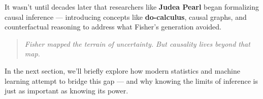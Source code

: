 \medskip

It wasn’t until decades later that researchers like \textbf{Judea Pearl} began formalizing causal inference — introducing concepts like \textbf{do-calculus}, causal graphs, and counterfactual reasoning to address what Fisher’s generation avoided.

\medskip

\begin{quote}
\textit{Fisher mapped the terrain of uncertainty. But causality lives beyond that map.}
\end{quote}

In the next section, we’ll briefly explore how modern statistics and machine learning attempt to bridge this gap — and why knowing the limits of inference is just as important as knowing its power.

